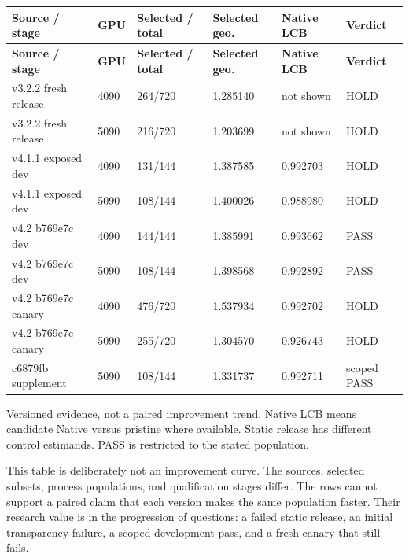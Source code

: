 \documentclass[11pt,a4paper]{article}
\begin{document}
\begin{small}
\begin{longtable}{@{}p{4.1cm}p{1.1cm}p{2.3cm}p{2.2cm}p{2.2cm}p{2.3cm}@{}}
\toprule
\textbf{Source /\allowbreak{} stage} & \textbf{GPU} & \textbf{Selected /\allowbreak{} total} & \textbf{Selected geo.} & \textbf{Native LCB} & \textbf{Verdict} \\
\midrule\endfirsthead
\toprule
\textbf{Source /\allowbreak{} stage} & \textbf{GPU} & \textbf{Selected /\allowbreak{} total} & \textbf{Selected geo.} & \textbf{Native LCB} & \textbf{Verdict} \\
\midrule\endhead
v3.2.2 fresh release & 4090 & 264/\allowbreak{}720 & 1.285140 & not shown & HOLD \\
v3.2.2 fresh release & 5090 & 216/\allowbreak{}720 & 1.203699 & not shown & HOLD \\
v4.1.1 exposed dev & 4090 & 131/\allowbreak{}144 & 1.387585 & 0.992703 & HOLD \\
v4.1.1 exposed dev & 5090 & 108/\allowbreak{}144 & 1.400026 & 0.988980 & HOLD \\
v4.2 b769e7c dev & 4090 & 144/\allowbreak{}144 & 1.385991 & 0.993662 & PASS \\
v4.2 b769e7c dev & 5090 & 108/\allowbreak{}144 & 1.398568 & 0.992892 & PASS \\
v4.2 b769e7c canary & 4090 & 476/\allowbreak{}720 & 1.537934 & 0.992702 & HOLD \\
v4.2 b769e7c canary & 5090 & 255/\allowbreak{}720 & 1.304570 & 0.926743 & HOLD \\
c6879fb supplement & 5090 & 108/\allowbreak{}144 & 1.331737 & 0.992711 & scoped PASS \\
\bottomrule
\end{longtable}
\end{small}
\noindent\small Versioned evidence, not a paired improvement trend. Native LCB means candidate Native versus pristine where available. Static release has different control estimands. PASS is restricted to the stated population.\normalsize\par\medskip

This table is deliberately not an improvement curve. The sources, selected subsets, process populations, and qualification stages differ. The rows cannot support a paired claim that each version makes the same population faster. Their research value is in the progression of questions: a failed static release, an initial transparency failure, a scoped development pass, and a fresh canary that still fails.
\end{document}
